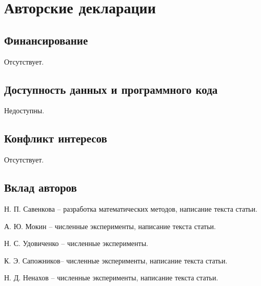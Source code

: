 \documentclass[pdflatex,sn-mathphys-gost]{pmi-jnl}
\begin{document}
\section*{Авторские декларации}

\subsection*{Финансирование}

Отсутствует.

\subsection*{Доступность данных и программного кода}

Недоступны.

\subsection*{Конфликт интересов}

Отсутствует.

\subsection*{Вклад авторов}

Н. П. Савенкова -- разработка математических методов, написание текста статьи.

А. Ю. Мокин -- численные эксперименты, написание текста статьи.

Н. С. Удовиченко -- численные эксперименты.

К. Э. Сапожников-- численные эксперименты, написание текста статьи.

Н. Д. Ненахов -- численные эксперименты, написание текста статьи.

\end{document}
